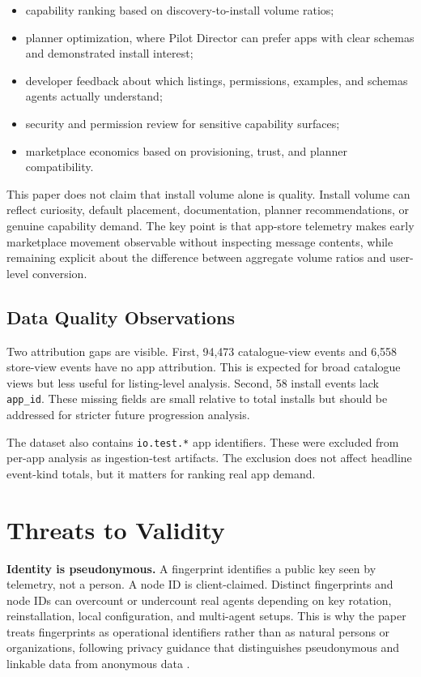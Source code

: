 \documentclass[10pt,twocolumn]{article}
\newcommand{\director}{Pilot Director}
\newcommand{\app}[1]{\texttt{#1}}
\begin{document}
\begin{itemize}
    \item capability ranking based on discovery-to-install volume ratios;
    \item planner optimization, where \director{} can prefer apps with clear schemas and demonstrated install interest;
    \item developer feedback about which listings, permissions, examples, and schemas agents actually understand;
    \item security and permission review for sensitive capability surfaces;
    \item marketplace economics based on provisioning, trust, and planner compatibility.
\end{itemize}

This paper does not claim that install volume alone is quality. Install volume can reflect curiosity, default placement, documentation, planner recommendations, or genuine capability demand. The key point is that app-store telemetry makes early marketplace movement observable without inspecting message contents, while remaining explicit about the difference between aggregate volume ratios and user-level conversion.

\subsection{Data Quality Observations}

Two attribution gaps are visible. First, 94,473 catalogue-view events and 6,558 store-view events have no app attribution. This is expected for broad catalogue views but less useful for listing-level analysis. Second, 58 install events lack \texttt{app\_id}. These missing fields are small relative to total installs but should be addressed for stricter future progression analysis.

The dataset also contains \app{io.test.*} app identifiers. These were excluded from per-app analysis as ingestion-test artifacts. The exclusion does not affect headline event-kind totals, but it matters for ranking real app demand.

\section{Threats to Validity}
\label{sec:validity}

\textbf{Identity is pseudonymous.} A fingerprint identifies a public key seen by telemetry, not a person. A node ID is client-claimed. Distinct fingerprints and node IDs can overcount or undercount real agents depending on key rotation, reinstallation, local configuration, and multi-agent setups. This is why the paper treats fingerprints as operational identifiers rather than as natural persons or organizations, following privacy guidance that distinguishes pseudonymous and linkable data from anonymous data \cite{nist800122,nistir8053}.
\end{document}
